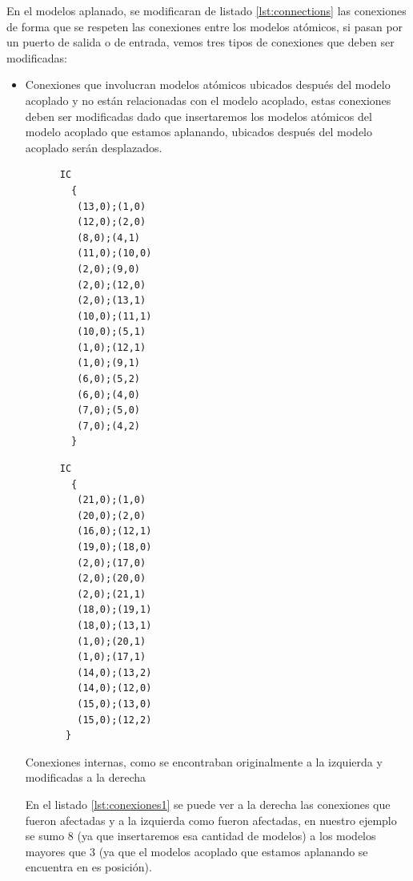         En el modelos aplanado, se modificaran de listado \ref{lst:connections} las conexiones de forma que se respeten las conexiones entre los modelos atómicos, si pasan por un puerto de salida o de entrada, vemos tres tipos de conexiones que deben ser modificadas:
\begin{itemize}
        \item Conexiones que involucran modelos atómicos ubicados después del modelo acoplado y no están relacionadas con el modelo acoplado, 
        estas conexiones deben ser modificadas dado que insertaremos los modelos atómicos del modelo acoplado que estamos aplanando, 
        ubicados después del modelo acoplado serán desplazados.
        
\begin{listing}[H]
        \begin{minipage}{0.5\textwidth}
\begin{verbatim}
      IC
        {
         (13,0);(1,0)
         (12,0);(2,0)
         (8,0);(4,1)
         (11,0);(10,0)
         (2,0);(9,0)
         (2,0);(12,0)
         (2,0);(13,1)
         (10,0);(11,1)
         (10,0);(5,1)
         (1,0);(12,1)
         (1,0);(9,1)
         (6,0);(5,2)
         (6,0);(4,0)
         (7,0);(5,0)
         (7,0);(4,2)
        }
\end{verbatim}
        \end{minipage}
        \begin{minipage}{0.5\textwidth}
\begin{verbatim}
      IC
        {
         (21,0);(1,0)
         (20,0);(2,0)
         (16,0);(12,1)
         (19,0);(18,0)
         (2,0);(17,0)
         (2,0);(20,0)
         (2,0);(21,1)
         (18,0);(19,1)
         (18,0);(13,1)
         (1,0);(20,1)
         (1,0);(17,1)
         (14,0);(13,2)
         (14,0);(12,0)
         (15,0);(13,0)
         (15,0);(12,2)
       }
\end{verbatim}
        \end{minipage}
\label{lst:conexiones1}
\caption{Conexiones internas, como se encontraban originalmente a la izquierda y modificadas a la derecha}
\end{listing}

        En el listado \ref{lst:conexiones1} se puede ver a la derecha las conexiones que fueron afectadas y a la izquierda como fueron afectadas, en nuestro ejemplo
        se sumo $8$ (ya que insertaremos esa cantidad de modelos) a los modelos mayores que $3$ (ya que el modelos acoplado que estamos aplanando se encuentra en 
        es posición).


\end{itemize}
